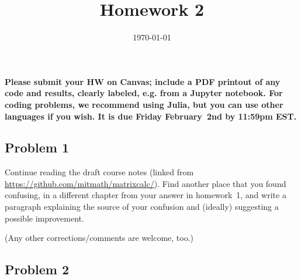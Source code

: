 \documentclass[10pt,oneside]{article}
\author{}
\title{Homework 2}
\date{\today}
\begin{document}
\maketitle
\thispagestyle{fancy}

{\bf Please submit your HW on Canvas; include a PDF printout of any code and results, clearly labeled, e.g. from a Jupyter notebook.  For coding problems, we recommend using Julia, but you can use other languages if you wish. It is due Friday February~2nd by 11:59pm EST.  }

\subsection*{Problem 1}

Continue reading the draft course notes (linked from \url{https://github.com/mitmath/matrixcalc/}).   Find another place that you found confusing, in a different chapter from your answer in homework~1, and write a paragraph explaining the source of your confusion and (ideally) suggesting a possible improvement.

(Any other corrections/comments are welcome, too.)

\subsection*{Problem 2}
\end{document}
